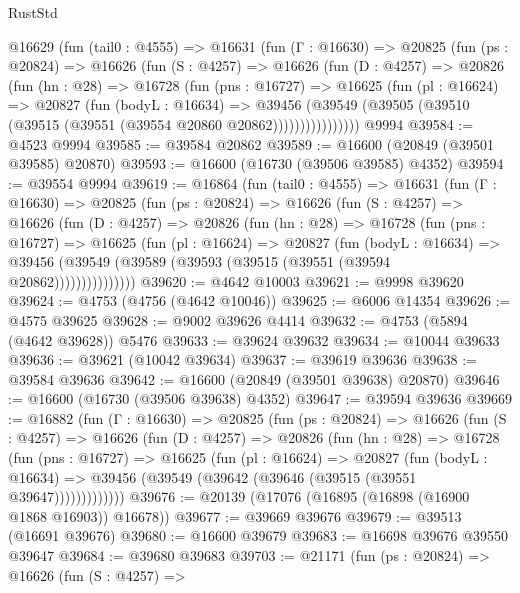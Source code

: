 \begin{lexlean}{RustStd}
\begin{coremodule}
    @16629
      (fun (tail0 : @4555) =>
      @16631
        (fun (Γ : @16630) =>
        @20825
          (fun (ps : @20824) =>
          @16626
            (fun (S : @4257) =>
            @16626
              (fun (D : @4257) =>
              @20826
                (fun (hn : @28) =>
                @16728
                  (fun (pns : @16727) =>
                  @16625
                    (fun (pl : @16624) =>
                    @20827
                      (fun (bodyL : @16634) =>
                      @39456
                        (@39549
                          (@39505 (@39510 (@39515 (@39551 (@39554 @20860 @20862))))))))))))))))
    @9994
@39584 := @4523 @9994
@39585 := @39584 @20862
@39589 := @16600 (@20849 (@39501 @39585) @20870)
@39593 := @16600 (@16730 (@39506 @39585) @4352)
@39594 := @39554 @9994
@39619 := @16864
    (fun (tail0 : @4555) =>
    @16631
      (fun (Γ : @16630) =>
      @20825
        (fun (ps : @20824) =>
        @16626
          (fun (S : @4257) =>
          @16626
            (fun (D : @4257) =>
            @20826
              (fun (hn : @28) =>
              @16728
                (fun (pns : @16727) =>
                @16625
                  (fun (pl : @16624) =>
                  @20827
                    (fun (bodyL : @16634) =>
                    @39456 (@39549 (@39589 (@39593 (@39515 (@39551 (@39594 @20862)))))))))))))))
@39620 := @4642 @10003
@39621 := @9998 @39620
@39624 := @4753 (@4756 (@4642 @10046))
@39625 := @6006 @14354
@39626 := @4575 @39625
@39628 := @9002 @39626 @4414
@39632 := @4753 (@5894 (@4642 @39628)) @5476
@39633 := @39624 @39632
@39634 := @10044 @39633
@39636 := @39621 (@10042 @39634)
@39637 := @39619 @39636
@39638 := @39584 @39636
@39642 := @16600 (@20849 (@39501 @39638) @20870)
@39646 := @16600 (@16730 (@39506 @39638) @4352)
@39647 := @39594 @39636
@39669 := @16882
    (fun (Γ : @16630) =>
    @20825
      (fun (ps : @20824) =>
      @16626
        (fun (S : @4257) =>
        @16626
          (fun (D : @4257) =>
          @20826
            (fun (hn : @28) =>
            @16728
              (fun (pns : @16727) =>
              @16625
                (fun (pl : @16624) =>
                @20827
                  (fun (bodyL : @16634) =>
                  @39456 (@39549 (@39642 (@39646 (@39515 (@39551 @39647)))))))))))))
@39676 := @20139 (@17076 (@16895 (@16898 (@16900 @1868 @16903)) @16678))
@39677 := @39669 @39676
@39679 := @39513 (@16691 @39676)
@39680 := @16600 @39679
@39683 := @16698 @39676 @39550 @39647
@39684 := @39680 @39683
@39703 := @21171
    (fun (ps : @20824) =>
    @16626
      (fun (S : @4257) =>

\end{coremodule}
\end{lexlean}
